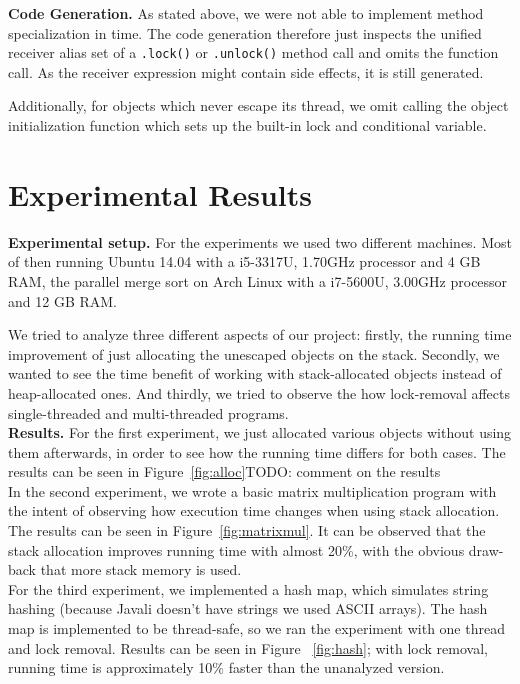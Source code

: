 \documentclass[letterpaper]{article}
\newcommand{\mypar}[1]{{\bf #1.}}
\begin{document}
\mypar{Code Generation}
As stated above, we were not able to implement method specialization in time. The code generation
therefore just inspects the unified receiver alias set of a \texttt{.lock()} or  \texttt{.unlock()} method
call and omits the function call. As the receiver expression might contain side effects, it
is still generated.

Additionally, for objects which never escape its thread, we omit calling the object initialization
function which sets up the built-in lock and conditional variable.

\section{Experimental Results}\label{sec:exp}

\mypar{Experimental setup} For the experiments we used two different machines. Most of then running
Ubuntu 14.04 with a i5-3317U, 1.70GHz processor and 4 GB RAM, the parallel merge sort
on Arch Linux with a i7-5600U, 3.00GHz processor and 12 GB RAM.

We tried to analyze three different aspects of our project: firstly, the running time improvement of just allocating
the unescaped objects on the stack. Secondly, we wanted to see the time benefit of working with stack-allocated
objects instead of heap-allocated ones. And thirdly, we tried to observe the how lock-removal affects single-threaded
and multi-threaded programs.\\

\mypar{Results}
For the first experiment, we just allocated various objects without using them afterwards, in order to see how the running time differs
for both cases. The results can be seen in Figure~\ref{fig:alloc}TODO: comment on the results\\

In the second experiment, we wrote a basic matrix multiplication program with the intent of observing how execution time changes when using
stack allocation. The results can be seen in Figure~\ref{fig:matrixmul}. It can be observed that the stack allocation improves running
time with almost 20\%, with the obvious draw-back that more stack memory is used.\\

For the third experiment, we implemented a hash map, which simulates string hashing (because Javali doesn't have strings we used ASCII arrays).
The hash map is implemented to be thread-safe, so we ran the experiment with one thread and lock removal. Results can be seen in Figure~
\ref{fig:hash}; with lock removal, running time is approximately 10\% faster than the unanalyzed version.\\
\end{document}
